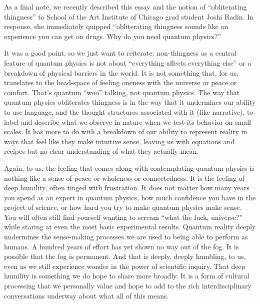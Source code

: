 \documentclass[12pt,onecolumn,preprintnumbers,amsmath,amssymbn,reprint,nofootinbib,superscriptaddress]{revtex4}    %
\begin{document}


As a final note, we recently described this essay and the notion of ``obliterating thingness'' to School of the Art Institute of Chicago grad student Joshi Radin.  In response, she immediately quipped ``obliterating thingness sounds like an experience you can get on drugs. Why do you need quantum physics?''

It was a good point, so we just want to reiterate: non-thingness as a central feature of quantum physics is not about ``everything affects everything else'' or a breakdown of physical barriers in the world.  It is not something that, for us, translates to the head-space of feeling oneness with the universe or peace or comfort.  That's quantum ``woo'' talking, not quantum physics.  The way that quantum physics obliterates thingness is in the way that it undermines our ability to use language, and the thought structures associated with it (like narrative), to label and describe what we observe in nature when we test its behavior on small scales. It has more to do with a breakdown of our ability to represent reality in ways that feel like they make intuitive sense, leaving us with equations and recipes but no clear understanding of what they actually mean.  

Again, to us, the feeling that comes along with contemplating quantum physics is nothing like a sense of peace or wholeness or connectedness.  It is the feeling of deep humility, often tinged with frustration.  It does not matter how many years you spend as an expert in quantum physics, how much confidence you have in the project of science, or how hard you try to make quantum physics make sense.  You will often still find yourself wanting to scream ``what the fuck, universe?'' while staring at even the most basic experimental results.  Quantum reality deeply undermines the sense-making processes we are used to being able to perform as humans. A hundred years of effort has yet shown no way out of the fog.  It is possible that the fog is permanent. And that is deeply, deeply humbling, to us, even as we still experience wonder in the power of scientific inquiry.  That deep humility is something we do hope to share more broadly.  It is a form of cultural processing that we personally value and hope to add to the rich interdisciplinary conversations underway about what all of this means.  
\end{document}
